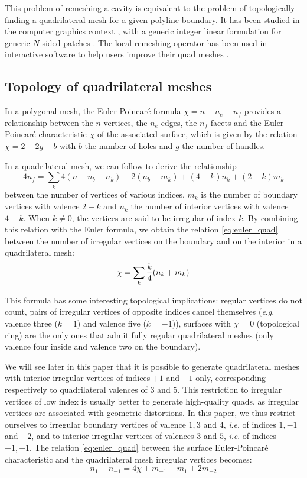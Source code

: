 \documentclass[AMA,STIX1COL]{WileyNJD-v2}
\newcommand{\ie}{\textit{i}.\textit{e}. }
\newcommand{\eg}{\textit{e}.\textit{g}. }
\begin{document}
{This problem of remeshing a cavity is equivalent to the problem of
topologically finding a quadrilateral mesh for a given polyline boundary.
It has been studied in the computer graphics context \cite{yasseen2013},
with a generic integer linear formulation for generic $N$-sided patches
\cite{takayama2014}. The local remeshing operator has been used
in interactive software to help users improve their quad meshes \cite{marcias2015}.


\subsection{Topology of quadrilateral meshes}
\label{sec:topo_quad}

In a polygonal mesh, the Euler-Poincar\'e formula $\chi = n - n_e + n_f$ provides a
relationship between the $n$ vertices, the $n_e$ edges, the $n_f$ facets and 
the Euler-Poincar\'e characteristic $\chi$  of the associated surface, which is
given by the relation $\chi = 2 - 2g - b$ with $b$ the number of holes and $g$
the number of handles.

In a quadrilateral mesh, we can follow \cite{beaufort2017} to derive the relationship
$$4 n_f = \sum_k 4 (n - n_b - n_k) + 2 (n_b - m_k) + (4-k) n_k + (2-k) m_k$$
between the number of vertices of various indices. $m_k$ is the number of boundary
vertices with valence $2-k$ and $n_k$ the number of interior vertices with valence $4-k$.
When $k\neq 0$, the vertices are said to be irregular of index $k$.
By combining this relation with the Euler formula, we obtain \cite{beaufort2017} the relation
\eqref{eq:euler_quad} between the number of irregular vertices on the boundary and on the interior
in a quadrilateral mesh:
\begin{equation}
    \label{eq:euler_quad}
    \chi = \sum_k {k\over 4} (n_k+m_k)
\end{equation}

This formula has some interesting topological implications: regular vertices do not count,
pairs of irregular vertices of opposite indices cancel themselves (\eg valence
three ($k=1$) and valence five ($k=-1$)), surfaces with $\chi=0$ (topological
ring) are the only ones that admit fully regular quadrilateral meshes (only valence four inside and
valence two on the boundary).

We will see later in this paper that it is possible to generate
quadrilateral meshes with interior irregular vertices of indices $+1$ and $-1$ only,
corresponding respectively to quadrilateral valences of $3$ and $5$.  
This restriction to irregular vertices of low index is usually better
to generate high-quality quads, as irregular vertices are associated with 
geometric distortions.
In this paper, we thus restrict ourselves to irregular boundary vertices of valence $1,3$ and $4$,
\ie of indices $1,-1$ and $-2$, and to interior irregular vertices of valences $3$ and $5$, \ie of
indices $+1,-1$. The relation \eqref{eq:euler_quad} between the surface Euler-Poincar\'e characteristic
and the quadrilateral mesh irregular vertices becomes:
\begin{equation}
    \label{eq:euler_quad_2}
    n_{1} - n_{-1} = 4 \chi + m_{-1} - m_{1} + 2 m_{-2} 
\end{equation}

}
\end{document}
